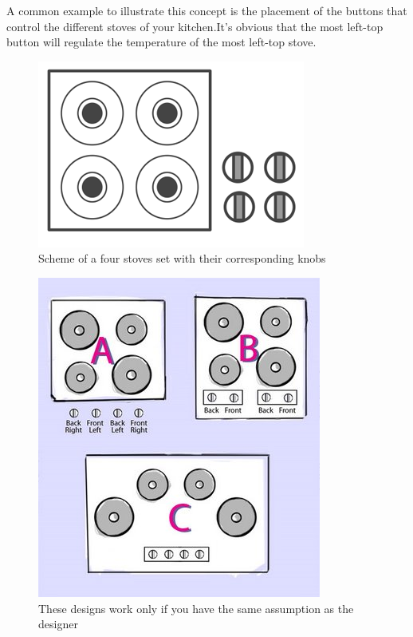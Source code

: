 \documentclass[a4paper,11pt] {article}
\theoremstyle{definition}
\begin{document}
A common example to illustrate this concept is the placement of the buttons that control the different stoves of your kitchen.It's obvious that the most left-top button will regulate the temperature of the most left-top stove.\\
 \begin{minipage}{\linewidth}
      \centering
      \begin{minipage}{0.45\linewidth}
          \begin{figure}[H]
          \centering
              \includegraphics[scale=0.3]{fig-report/stove_natural.png}
              \caption{Scheme of a four stoves set with their corresponding knobs}
          \end{figure}
      \end{minipage}
      \hspace{0.05\linewidth}
      \begin{minipage}{0.45\linewidth}
          \begin{figure}[H]
                    \centering
              \includegraphics[scale=0.4]{fig-report/NormanBurners.jpg}
              \caption{These designs work only if you have the same assumption as the designer\cite{stoveMapping}}
          \end{figure}
      \end{minipage}
  \end{minipage}
  \bigskip
\end{document}
